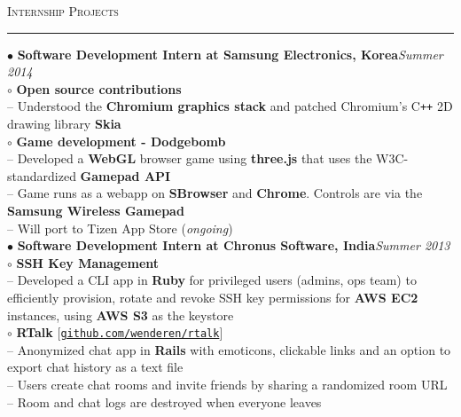 \documentclass[a4paper,9pt]{article}
\begin{document}
\Large{\textsc{Internship Projects}}\vspace{1.5pt}
\hrule\vspace{0.25cm}
\small
$\bullet$ \textbf{Software Development Intern at Samsung Electronics, Korea}\hfill \textit{Summer 2014}\\
$\circ$ \textbf{Open source contributions}\\
-- Understood the \textbf{Chromium graphics stack} and patched Chromium's C\verb!++! 2D drawing library \textbf{Skia}\\
$\circ$ \textbf{Game development - Dodgebomb}\\
-- Developed a \textbf{WebGL} browser game using \textbf{three.js} that uses the W3C-standardized \textbf{Gamepad API}\\
-- Game runs as a webapp on \textbf{SBrowser} and \textbf{Chrome}. Controls are via the \textbf{Samsung Wireless Gamepad}\\
-- Will port to Tizen App Store (\textit{ongoing})\\
$\bullet$ \textbf{Software Development Intern at Chronus Software, India}\hfill \textit{Summer 2013}\\
$\circ$ \textbf{SSH Key Management}\\
-- Developed a CLI app in \textbf{Ruby} for privileged users (admins, ops team) to efficiently provision, rotate and revoke SSH key permissions for \textbf{AWS EC2} instances, using \textbf{AWS S3} as the keystore\\
$\circ$ \textbf{RTalk} [\href{https://github.com/wenderen/rtalk}{\texttt{github.com/wenderen/rtalk}}]\\
-- Anonymized chat app in \textbf{Rails} with emoticons, clickable links and an option to export chat history as a text file\\
-- Users create chat rooms and invite friends by sharing a randomized room URL\\
-- Room and chat logs are destroyed when everyone leaves\\
\end{document}
